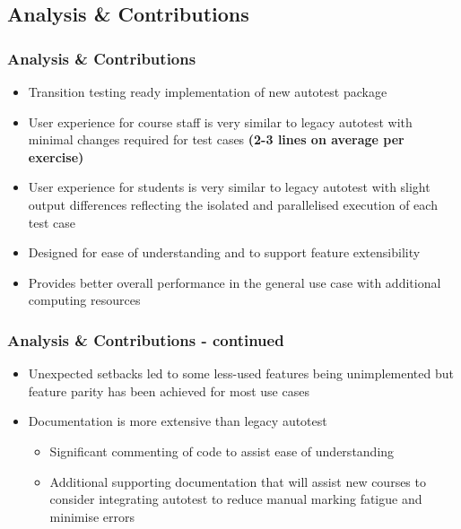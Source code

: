 \documentclass[xcolor, handout]{beamer}
\begin{document}
\subsection{Analysis \& Contributions}
\begin{frame}
	\frametitle{Analysis \& Contributions}
	\begin{itemize}
		\setlength\itemsep{1em}
		\item Transition testing ready implementation of new autotest package
			\pause
		\item User experience for course staff is very similar to legacy autotest with minimal changes required for test cases \textbf{(2-3 lines on average per exercise)}
			\pause
		\item User experience for students is very similar to legacy autotest with slight output differences reflecting the isolated and parallelised execution of each test case
			\pause
		\item Designed for ease of understanding and to support feature extensibility
			\pause
		\item Provides better overall performance in the general use case with additional computing resources
	\end{itemize}
\end{frame}
\begin{frame}
	\frametitle{Analysis \& Contributions - continued}
	\begin{itemize}
		\setlength\itemsep{1em}
		\item Unexpected setbacks led to some less-used features being unimplemented but feature parity has been achieved for most use cases
			\pause
		\item Documentation is more extensive than legacy autotest
		\begin{itemize}
			\setlength\itemsep{0.5em}
			\item Significant commenting of code to assist ease of understanding
				\pause
			\item Additional supporting documentation that will assist new courses to consider integrating autotest to reduce manual marking fatigue and minimise errors
		\end{itemize}
	\end{itemize}
\end{frame}
\end{document}
